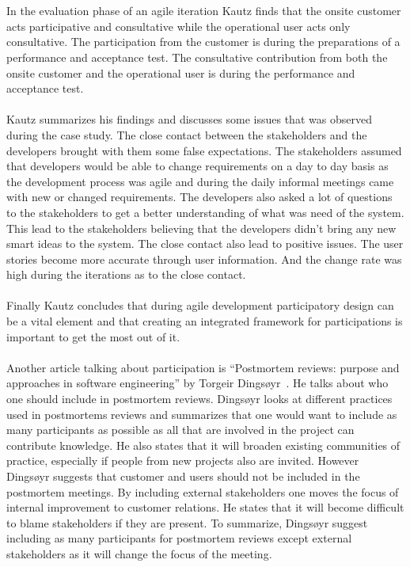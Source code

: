 \documentclass[12pt]{article}
\begin{document}
\\\\
In the evaluation phase of an agile iteration Kautz finds that the onsite customer acts participative and consultative while the operational user acts only consultative. The participation from the customer is during the preparations of a performance and acceptance test. The consultative contribution from both the onsite customer and the operational user is during the performance and acceptance test. 
\\\\
Kautz summarizes his findings and discusses some issues that was observed during the case study. The close contact between the stakeholders and the developers brought with them some false expectations. The stakeholders assumed that developers would be able to change requirements on a day to day basis as the development process was agile and during the daily informal meetings came with new or changed requirements. The developers also asked a lot of questions to the stakeholders to get a better understanding of what was need of the system. This lead to the stakeholders believing that the developers didn't bring any new smart ideas to the system. The close contact also lead to positive issues. The user stories become more accurate through user information. And the change rate was high during the iterations as to the close contact. 
\\\\
Finally Kautz concludes that during agile development participatory design can be a vital element and that creating an integrated framework for participations is important to get the most out of it. 
\\\\
Another article talking about participation is ``Postmortem reviews: purpose and approaches in software engineering'' by Torgeir Dingsøyr~\cite{Dingsoyr}. He talks about who one should include in postmortem reviews. Dingsøyr looks at different practices used in postmortems reviews and summarizes that one would want to include as many participants as possible as all that are involved in the project can contribute knowledge. He also states that it will broaden existing communities of practice, especially if people from new projects also are invited. However Dingsøyr suggests that customer and users should not be included in the postmortem meetings. By including external stakeholders one moves the focus of internal improvement to customer relations. He states that it will become difficult to blame stakeholders if they are present. To summarize, Dingsøyr suggest including as many participants for postmortem reviews except external stakeholders as it will change the focus of the meeting. 
\end{document}
